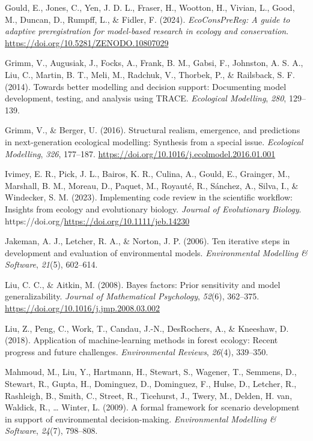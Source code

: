 \documentclass[
]{article}
\newlength{\cslhangindent}
\newenvironment{CSLReferences}[2] %
 {\begin{list}{}{%
  \setlength{\itemindent}{0pt}
  \setlength{\leftmargin}{0pt}
  \setlength{\parsep}{0pt}
  \ifodd #1
   \setlength{\leftmargin}{\cslhangindent}
   \setlength{\itemindent}{-1\cslhangindent}
  \fi
  \setlength{\itemsep}{#2\baselineskip}}}
 {\end{list}}
\begin{document}
\begin{CSLReferences}{1}{0}
Gould, E., Jones, C., Yen, J. D. L., Fraser, H., Wootton, H., Vivian,
L., Good, M., Duncan, D., Rumpff, L., \& Fidler, F. (2024).
\emph{EcoConsPreReg: A guide to adaptive preregistration for model-based
research in ecology and conservation}.
\url{https://doi.org/10.5281/ZENODO.10807029}

Grimm, V., Augusiak, J., Focks, A., Frank, B. M., Gabsi, F., Johnston,
A. S. A., Liu, C., Martin, B. T., Meli, M., Radchuk, V., Thorbek, P., \&
Railsback, S. F. (2014). Towards better modelling and decision support:
Documenting model development, testing, and analysis using TRACE.
\emph{Ecological Modelling}, \emph{280}, 129--139.

Grimm, V., \& Berger, U. (2016). Structural realism, emergence, and
predictions in next-generation ecological modelling: Synthesis from a
special issue. \emph{Ecological Modelling}, \emph{326}, 177--187.
\url{https://doi.org/10.1016/j.ecolmodel.2016.01.001}

Ivimey, E. R., Pick, J. L., Bairos, K. R., Culina, A., Gould, E.,
Grainger, M., Marshall, B. M., Moreau, D., Paquet, M., Royauté, R.,
Sánchez, A., Silva, I., \& Windecker, S. M. (2023). Implementing code
review in the scientific workflow: Insights from ecology and
evolutionary biology. \emph{Journal of Evolutionary Biology}.
https://doi.org/\url{https://doi.org/10.1111/jeb.14230}

Jakeman, A. J., Letcher, R. A., \& Norton, J. P. (2006). Ten iterative
steps in development and evaluation of environmental models.
\emph{Environmental Modelling \& Software}, \emph{21}(5), 602--614.

Liu, C. C., \& Aitkin, M. (2008). Bayes factors: Prior sensitivity and
model generalizability. \emph{Journal of Mathematical Psychology},
\emph{52}(6), 362--375. \url{https://doi.org/10.1016/j.jmp.2008.03.002}

Liu, Z., Peng, C., Work, T., Candau, J.-N., DesRochers, A., \& Kneeshaw,
D. (2018). Application of machine-learning methods in forest ecology:
Recent progress and future challenges. \emph{Environmental Reviews},
\emph{26}(4), 339--350.

Mahmoud, M., Liu, Y., Hartmann, H., Stewart, S., Wagener, T., Semmens,
D., Stewart, R., Gupta, H., Dominguez, D., Dominguez, F., Hulse, D.,
Letcher, R., Rashleigh, B., Smith, C., Street, R., Ticehurst, J., Twery,
M., Delden, H. van, Waldick, R., \ldots{} Winter, L. (2009). A formal
framework for scenario development in support of environmental
decision-making. \emph{Environmental Modelling \& Software},
\emph{24}(7), 798--808.


\end{CSLReferences}
\end{document}
